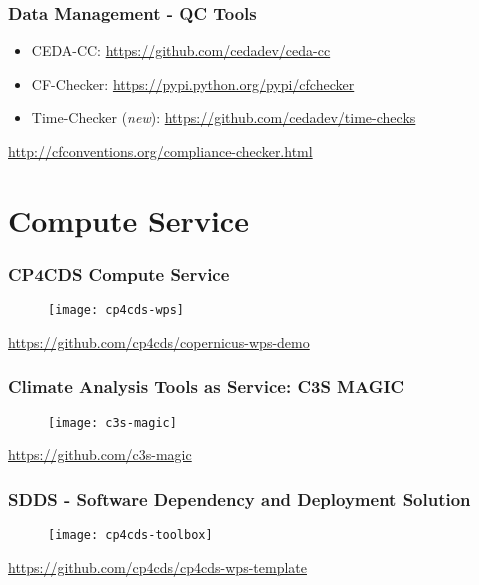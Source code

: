 \documentclass{beamer}
\begin{document}
\begin{frame}
\frametitle<presentation>{Data Management - QC Tools}
  \begin{itemize}
    \item CEDA-CC: \url{https://github.com/cedadev/ceda-cc}
    \item CF-Checker: \url{https://pypi.python.org/pypi/cfchecker}
    \item Time-Checker (\emph{new}): \url{https://github.com/cedadev/time-checks}
  \end{itemize}

  \centering
  \footnotesize{\url{http://cfconventions.org/compliance-checker.html}}

\end{frame}




\section{Compute Service}

\begin{frame}
\frametitle<presentation>{CP4CDS Compute Service}

  \begin{figure}[ht]
    \centering
    \texttt{[image: cp4cds-wps]}
  \end{figure}

  \centering
  \footnotesize{\url{https://github.com/cp4cds/copernicus-wps-demo}}

\end{frame}

\begin{frame}
\frametitle<presentation>{Climate Analysis Tools as Service: C3S MAGIC}

  \begin{figure}[ht]
    \centering
    \texttt{[image: c3s-magic]}
  \end{figure}

  \centering
  \footnotesize{\url{https://github.com/c3s-magic}}

\end{frame}

\begin{frame}
\frametitle<presentation>{SDDS - Software Dependency and Deployment Solution}

  \begin{figure}[ht]
    \centering
    \texttt{[image: cp4cds-toolbox]}
  \end{figure}

  \centering
  \footnotesize{\url{https://github.com/cp4cds/cp4cds-wps-template}}

\end{frame}
\end{document}
